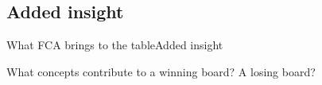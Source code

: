 \subsection{Added insight}
\begin{frame}{What FCA brings to the table}{Added insight}

\Large{What concepts contribute to a winning board? A losing board?}

\end{frame}

